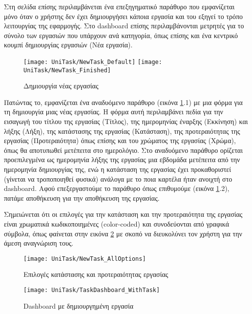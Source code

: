         Στη σελίδα επίσης περιλαμβάνεται ένα επεξηγηματικό παράθυρο που εμφανίζεται μόνο όταν ο χρήστης δεν έχει δημιουργήσει κάποια εργασία και του εξηγεί το τρόπο λειτουργίας της εφαρμογής. Στο {\Zona dashboard} επίσης περιλαμβάνονται μετρητές για το σύνολο των εργασιών που υπάρχουν ανά κατηγορία, όπως επίσης και ένα κεντρικό κουμπί δημιουργίας εργασιών ({\Zona Νέα εργασία}).

        \begin{figure}[h!] \noindent \centering
            \texttt{[image: UniTask/NewTask\_Default]}
            \texttt{[image: UniTask/NewTask\_Finished]}
            \caption{\centering Δημιουργία νέας εργασίας}
            \label{fig:unitask_NewTask}
        \end{figure}

        Πατώντας το, εμφανίζεται ένα αναδυόμενο παράθυρο (εικόνα \ref{fig:unitask_NewTask}.1) με μια φόρμα για τη δημιουργία μιας νέας εργασίας. Η φόρμα αυτή περιλαμβάνει πεδία για την εισαγωγή του τίτλου της εργασίας ({\Zona Τίτλος}), της ημερομηνίας έναρξης ({\Zona Εκκίνηση}) και λήξης ({\Zona Λήξη}), της κατάστασης της εργασίας ({\Zona Κατάσταση}), της προτεραιότητας της εργασίας ({\Zona Προτεραιότητα}) όπως επίσης και του χρώματος της εργασίας ({\Zona Χρώμα}), όπως θα αποτυπωθεί μετέπειτα στο ημερολόγιο. Στο αναδυόμενο παράθυρο ορίζεται προεπιλεγμένα ως ημερομηνία λήξης της εργασίας μια εβδομάδα μετέπειτα από την ημερομηνία δημιουργίας της, ενώ η κατάσταση της εργασίας έχει προκαθοριστεί (γίνεται να τροποποιηθεί φυσικά) ανάλογα με το ποια καρτέλα ήταν ανοιχτή στο dashboard. Αφού επεξεργαστούμε το παράθυρο όπως επιθυμούμε (εικόνα \ref{fig:unitask_NewTask}.2), πατάμε αποθήκευση για την αποθήκευση της εργασίας.

        Σημειώνεται ότι οι επιλογές για την κατάσταση και την προτεραιότητα της εργασίας είναι χρωματικά κωδικοποιημένες (color-coded) και συνοδεύονται από γραφικά σύμβολα, όπως φαίνεται στην εικόνα \ref{fig:unitask_NewTask_AllOptions} με σκοπό να διευκολύνει τον χρήστη για την άμεση αναγνώριση τους.

        \begin{figure}[h!] \noindent \centering
            \texttt{[image: UniTask/NewTask\_AllOptions]}
            \caption{\centering Επιλογές κατάστασης και προτεραιότητας εργασίας}
            \label{fig:unitask_NewTask_AllOptions}
        \end{figure}

        \begin{figure}[h!] \noindent \centering
            \texttt{[image: UniTask/TaskDashboard\_WithTask]}
            \caption{\centering Dashboard με δημιουργημένη εργασία}
            \label{fig:unitask_TaskDashboard_WithTask}
        \end{figure}

